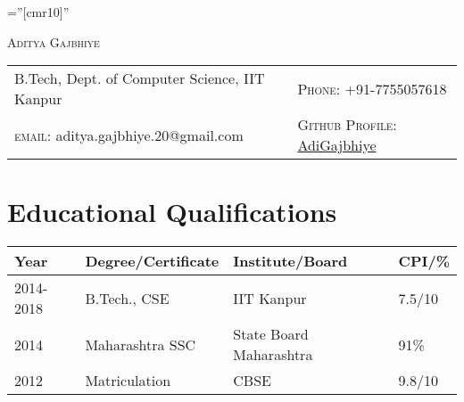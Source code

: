 \documentclass{article}
\begin{document}
\pagestyle{empty} %

\font\fb=''[cmr10]'' %

\par{
		{\Huge  \textsc{Aditya Gajbhiye}
	}\par}

\begin{tabularx}{\textwidth}{Xl}
	B.Tech, Dept. of Computer Science, IIT Kanpur &
	\textsc{Phone:}     +91-7755057618\\
	\textsc{email:}     aditya.gajbhiye.20@gmail.com  &
	\textsc{Github Profile:}   \href{https://github.com/adigajbhiye}{AdiGajbhiye}\\
\end{tabularx}
\vspace{-5mm}

\section{Educational Qualifications}
\centering
\begin{tabularx}{\textwidth}{|X|X|X|l|}
\hline
\rowcolor[HTML]{C0C0C0} 
\hline
\textbf{Year} & \textbf{Degree/Certificate} & \textbf{Institute/Board} & \textbf{CPI/\%} \\ \hline
2014-2018  & B.Tech., CSE                & IIT Kanpur               & 7.5/10          \\ \hline
2014          & Maharashtra SSC                      & State Board Maharashtra  & 91\%          \\ \hline
2012          & Matriculation               & CBSE                     & 9.8/10          \\ \hline
\end{tabularx}
\vspace{-2mm}
\end{document}
